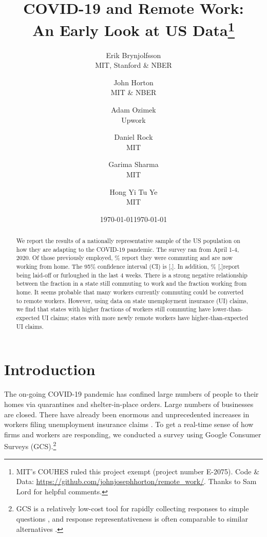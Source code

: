 \documentclass[12pt]{article}
\newcommand{\covid}{COVID-19}
\begin{document}
 

\title{COVID-19 and Remote Work:\\ An Early Look at US Data\footnote{
    MIT's COUHES ruled this project exempt (project number E-2075).
    {Code \& Data: \href{https://github.com/johnjosephhorton/remote\_work/}{https://github.com/johnjosephhorton/remote\_work/}}.
    Thanks to Sam Lord for helpful comments. 
  }}

\date{\today}

\date{\today}


\author{Erik Brynjolfsson\\MIT, Stanford \& NBER \and John Horton\\MIT \& NBER \and Adam Ozimek\\Upwork \and Daniel Rock\\MIT \and Garima Sharma\\MIT \and Hong Yi Tu Ye\\MIT}


\maketitle

\begin{abstract}
  \noindent 
  We report the results of a nationally representative sample of the US population on how they are adapting to the \covid{} pandemic.
  The survey ran from April 1-4, 2020.
  Of those previously employed, \WFH{}\% report they were commuting and are now working from home.
  The 95\% confidence interval (CI) is [\WFHLB,\WFHUB]. 
  In addition, \LaidOff{}\% [\LaidOffLB,\LaidOffUB]report being laid-off or furloughed in the last 4 weeks.   
  There is a strong negative relationship between the fraction in a state still commuting to work and the fraction working from home. 
  It seems probable that many workers currently commuting could be converted to remote workers. 
  However, using data on state unemployment insurance (UI) claims, we find that states with higher fractions of workers still commuting have lower-than-expected UI claims;
  states with more newly remote workers have higher-than-expected UI claims.
  \newline 
\end{abstract} 

\onehalfspacing 

\section{Introduction}
The on-going \covid{} pandemic has confined large numbers of people to their homes via quarantines and shelter-in-place orders.
Large numbers of businesses are closed. 
There have already been enormous and unprecedented increases in workers filing unemployment insurance claims \citep{goldsmith2020}. 
To get a real-time sense of how firms and workers are responding, we conducted a survey using Google Consumer Surveys (GCS).\footnote{
GCS is a relatively low-cost tool for rapidly collecting responses to simple questions \cite{stephens2014hands}, and response representativeness is often comparable to similar alternatives \citep{santoso2016survey, brynjolfsson2019using}.
}
\end{document}
